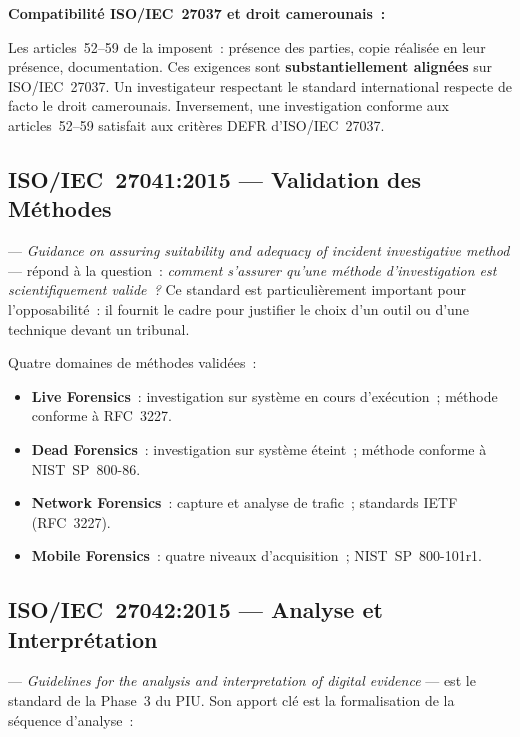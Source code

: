 \begin{boxjuris}
\textbf{Compatibilité ISO/IEC~27037 et droit camerounais~:}

Les articles~52--59 de la  imposent~: présence des parties,
copie réalisée en leur présence, documentation. Ces exigences sont
\textbf{substantiellement alignées} sur ISO/IEC~27037. Un investigateur
respectant le standard international respecte de facto le droit camerounais.
Inversement, une investigation conforme aux articles~52--59 satisfait
aux critères DEFR d'ISO/IEC~27037.
\end{boxjuris}

\subsection{ISO/IEC~27041:2015 --- Validation des Méthodes}

 --- \textit{Guidance on assuring suitability and
adequacy of incident investigative method} --- répond à la question~:
\emph{comment s'assurer qu'une méthode d'investigation est scientifiquement
valide~?} Ce standard est particulièrement important pour l'opposabilité~:
il fournit le cadre pour justifier le choix d'un outil ou d'une technique
devant un tribunal.

Quatre domaines de méthodes validées~:
\begin{itemize}
    \item \textbf{Live Forensics}~: investigation sur système en cours
          d'exécution~; méthode conforme à RFC~3227.
    \item \textbf{Dead Forensics}~: investigation sur système éteint~;
          méthode conforme à NIST~SP~800-86.
    \item \textbf{Network Forensics}~: capture et analyse de trafic~;
          standards IETF (RFC~3227).
    \item \textbf{Mobile Forensics}~: quatre niveaux d'acquisition~;
          NIST~SP~800-101r1.
\end{itemize}

\subsection{ISO/IEC~27042:2015 --- Analyse et Interprétation}

 --- \textit{Guidelines for the analysis and
interpretation of digital evidence} --- est le standard de la Phase~3 du PIU.
Son apport clé est la formalisation de la séquence d'analyse~:

